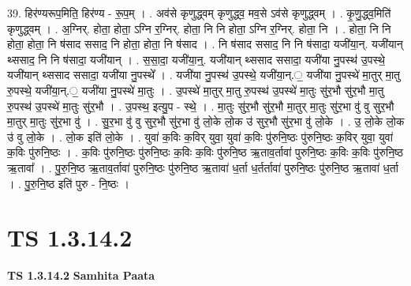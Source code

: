 \documentclass[17pt]{extarticle}
\begin{document}
39. हिर॑ण्यरूप॒मिति॒ हिर॑ण्य - रू॒प॒म् । . अव॑से कृणुद्ध्वम् कृणुद्ध्व॒ मव॒से ऽव॑से कृणुद्ध्वम् । . कृ॒णु॒द्ध्व॒मिति॑ कृणुद्ध्वम् । . अ॒ग्निर्. होता॒ होता॒ ऽग्नि र॒ग्निर्. होता॒ नि नि होता॒ ऽग्नि र॒ग्निर्. होता॒ नि । . होता॒ नि नि होता॒ होता॒ नि ष॑साद ससाद॒ नि होता॒ होता॒ नि ष॑साद । . नि ष॑साद ससाद॒ नि नि ष॑सादा॒ यजी॑या॒न्. यजी॑यान् थ्ससाद॒ नि नि ष॑सादा॒ यजी॑यान् । . स॒सा॒दा॒ यजी॑या॒न्॒. यजी॑यान् थ्ससाद ससादा॒ यजी॑या नु॒पस्थ॑ उ॒पस्थे॒ यजी॑यान् थ्ससाद ससादा॒ यजी॑या नु॒पस्थे᳚ । . यजी॑या नु॒पस्थ॑ उ॒पस्थे॒ यजी॑या॒न्.॒ यजी॑या नु॒पस्थे॑ मा॒तुर् मा॒तु रु॒पस्थे॒ यजी॑या॒न्.॒ यजी॑या नु॒पस्थे॑ मा॒तुः । . उ॒पस्थे॑ मा॒तुर् मा॒तु रु॒पस्थ॑ उ॒पस्थे॑ मा॒तुः सु॑र॒भौ सु॑र॒भौ मा॒तु रु॒पस्थ॑ उ॒पस्थे॑ मा॒तुः सु॑र॒भौ । . उ॒पस्थ॒ इत्यु॒प - स्थे॒ । . मा॒तुः सु॑र॒भौ सु॑र॒भौ मा॒तुर् मा॒तुः सु॑र॒भा वु॑ वु सुर॒भौ मा॒तुर् मा॒तुः सु॑र॒भा वु॑ । . सु॒र॒भा वु॑ वु सुर॒भौ सु॑र॒भा वु॑ लो॒के लो॒क उ॑ सुर॒भौ सु॑र॒भा वु॑ लो॒के । . उ॒ लो॒के लो॒क उ॑ वु लो॒के । . लो॒क इति॑ लो॒के । . युवा॑ क॒विः क॒विर् युवा॒ युवा॑ क॒विः पु॑रुनि॒ष्ठः पु॑रुनि॒ष्ठः क॒विर् युवा॒ युवा॑ क॒विः पु॑रुनि॒ष्ठः । . क॒विः पु॑रुनि॒ष्ठः पु॑रुनि॒ष्ठः क॒विः क॒विः पु॑रुनि॒ष्ठ ऋ॒ताव॒र्तावा॑ पुरुनि॒ष्ठः क॒विः क॒विः पु॑रुनि॒ष्ठ ऋ॒तावा᳚ । . पु॒रु॒नि॒ष्ठ ऋ॒ताव॒र्तावा॑ पुरुनि॒ष्ठः पु॑रुनि॒ष्ठ ऋ॒तावा॑ ध॒र्ता ध॒र्तर्तावा॑ पुरुनि॒ष्ठः पु॑रुनि॒ष्ठ ऋ॒तावा॑ ध॒र्ता । . पु॒रु॒नि॒ष्ठ इति॑ पुरु - नि॒ष्ठः । \newline
\pagebreak
{}
\section*{ TS 1.3.14.2 }

\textbf{TS 1.3.14.2 } \newline
\textbf{Samhita Paata} \newline
\end{document}
